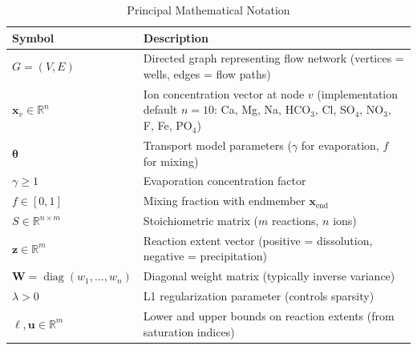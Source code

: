 \documentclass[12pt,a4paper]{article}
\theoremstyle{plain}
\theoremstyle{definition}
\theoremstyle{remark}
\DeclareMathOperator{\diag}{diag}
\begin{document}
\begin{table}[htbp]
	\centering
	\caption{Principal Mathematical Notation}
	\label{tab:notation}
	\begin{tabularx}{\textwidth}{@{} l X @{}}
		\toprule
		\textbf{Symbol}                                           & \textbf{Description}                                                                                                         \\
		\midrule
		$G = (V, E)$                                              & Directed graph representing flow network (vertices = wells, edges = flow paths)                                              \\
		$\mathbf{x}_v \in \mathbb{R}^n$                           & Ion concentration vector at node $v$ (implementation default $n=10$: Ca, Mg, Na, HCO$_3$, Cl, SO$_4$, NO$_3$, F, Fe, PO$_4$) \\
		$\boldsymbol{\theta}$                                     & Transport model parameters ($\gamma$ for evaporation, $f$ for mixing)                                                        \\
		$\gamma \geq 1$                                           & Evaporation concentration factor                                                                                             \\
		$f \in [0,1]$                                             & Mixing fraction with endmember $\mathbf{x}_{\text{end}}$                                                                     \\
		$S \in \mathbb{R}^{n \times m}$                           & Stoichiometric matrix ($m$ reactions, $n$ ions)                                                                              \\
		$\mathbf{z} \in \mathbb{R}^m$                             & Reaction extent vector (positive = dissolution, negative = precipitation)                                                    \\
		$\mathbf{W} = \diag(w_1, \ldots, w_n)$                    & Diagonal weight matrix (typically inverse variance)                                                                          \\
		$\lambda > 0$                                             & L1 regularization parameter (controls sparsity)                                                                              \\
		$\boldsymbol{\ell}, \mathbf{u} \in \mathbb{R}^m$          & Lower and upper bounds on reaction extents (from saturation indices)                                                         \\

\end{tabularx}
\end{table}
\end{document}
